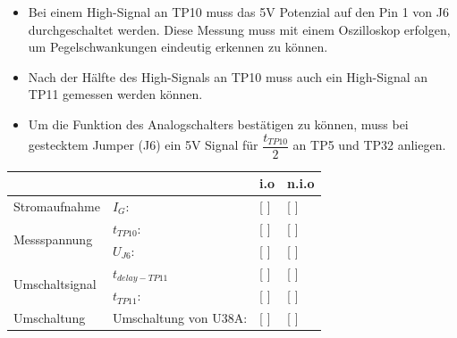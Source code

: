 \begin{itemize}
	\item{Bei einem High-Signal an TP10 muss das 5V Potenzial auf den Pin 1 von J6 durchgeschaltet werden. Diese Messung muss mit einem Oszilloskop erfolgen, um Pegelschwankungen eindeutig erkennen zu können.}
	
	\item{Nach der Hälfte des High-Signals an TP10 muss auch ein High-Signal an TP11 gemessen werden können.}
	
	\item{Um die Funktion des Analogschalters bestätigen zu können, muss bei gestecktem Jumper (J6) ein 5V Signal für $\dfrac{t_{TP10}}{2}$ an TP5 und TP32 anliegen.}
\end{itemize}


\renewcommand{\arraystretch}{2}
\begin{tabularx}{\textwidth}{p{}| p{} | p{} | p{}}

 &  & i.o & n.i.o \\

\hline

Stromaufnahme & $I_{G}$: & [ ] & [ ] \\

\hline

\multirow{2}{*}{Messspannung}
		& $t_{TP10}$:						& [ ] & [ ] \\
		& $U_{J6}$: 						& [ ] & [ ] \\

\hline

\multirow{2}{*}{Umschaltsignal}
		& $t_{delay-TP11}$	 				& [ ] & [ ] \\
		& $t_{TP11}$:						& [ ] & [ ] \\

\hline

Umschaltung & Umschaltung von U38A:	& [ ] & [ ] \\
		
\end{tabularx}
\renewcommand{\arraystretch}{1}


